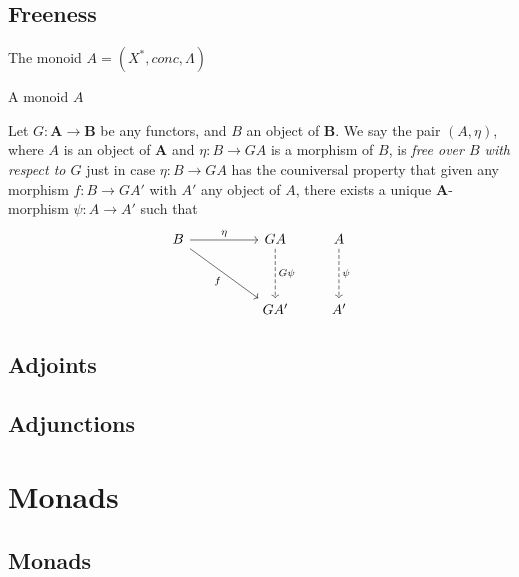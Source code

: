 \documentclass{article}
\begin{document}
\subsection{Freeness}
\begin{exam}[{\cite{AM75}}]
The monoid $A=(X^{*}, conc, \Lambda)$
\end{exam}

\begin{lem}[{\cite{AM75}}]
A monoid $A$
\end{lem}

\begin{defn}
Let $G: \mathbf{A} \rightarrow \mathbf{B}$ be any functors, and $B$ an object of $\mathbf{B}$.
We say the pair $(A, \eta)$, where $A$ is an object of $\mathbf{A}$ and $\eta: B \rightarrow GA$ is a morphism of $B$,
is \emph{free over $B$ with respect to $G$} just in case $\eta: B \rightarrow GA$ has the couniversal property that
given any morphism $f: B \rightarrow GA'$ with $A'$ any object of $A$,
there exists a unique $\mathbf{A}$-morphism $\psi: A \rightarrow A'$ such that
\[
\begin{tikzcd}[row sep=huge, column sep=huge]
B \arrow[r, "\eta"] \arrow[rd, "f"'] & GA \arrow[d, dashrightarrow, "G\psi"] \\
                                     & GA'
\end{tikzcd}
\qquad
\begin{tikzcd}[row sep=huge, column sep=huge]
A \arrow[d, dashrightarrow, "\psi"] \\
A'
\end{tikzcd}
\]
\end{defn}

\subsection{Adjoints}

\subsection{Adjunctions}

\section{Monads}

\subsection{Monads}
\end{document}
